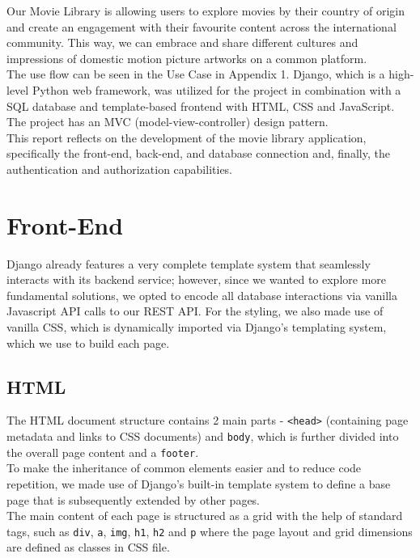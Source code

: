 \documentclass[letterpaper,twocolumn]{article}
\begin{document}
Our Movie Library is allowing users to explore movies by their country of origin and create an engagement with their favourite content across the international community. This way, we can embrace and share different cultures and impressions of domestic motion picture artworks on a common platform. \\

The use flow can be seen in the Use Case in Appendix 1. Django, which is a high-level Python web framework, was utilized for the project in combination with a SQL database and template-based frontend with HTML, CSS and JavaScript. The project has an MVC (model-view-controller) design pattern. \\

This report reflects on the development of the movie library application, specifically the front-end, back-end, and database connection and, finally, the authentication and authorization capabilities. 

\newpage{}

\section{Front-End}

Django already features a very complete template system that seamlessly interacts with its backend service; however, since we wanted to explore more fundamental solutions, we opted to encode all database interactions via vanilla Javascript API calls to our REST API. For the styling, we also made use of vanilla CSS, which is dynamically imported via Django's templating system, which we use to build each page.

\subsection{HTML}

The HTML document structure contains 2 main parts - \texttt{<head>} (containing page metadata and links to CSS documents) and \texttt{body}, which is further divided into the overall page content and a \texttt{footer}. \\

To make the inheritance of common elements easier and to reduce code repetition, we made use of Django's built-in template system to define a base page that is subsequently extended by other pages. \\

The main content of each page is structured as a grid with the help of standard tags, such as \texttt{div}, \texttt{a}, \texttt{img}, \texttt{h1}, \texttt{h2} and \texttt{p} where the page layout and grid dimensions are defined as classes in CSS file.
\end{document}
